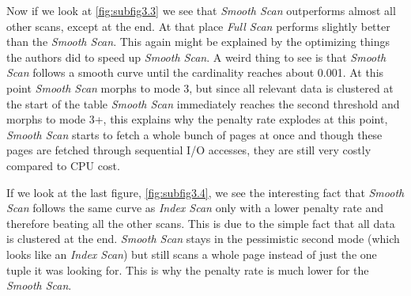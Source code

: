 \documentclass[a4paper,11pt,twoside]{article}
\begin{document}
Now if we look at \autoref{fig:subfig3.3} we see that \textit{Smooth Scan} outperforms almost all other scans, except at the end. At that place \textit{Full Scan} performs slightly better than the \textit{Smooth Scan}. This again might be explained by the optimizing things the authors did to speed up \textit{Smooth Scan}. A weird thing to see is that \textit{Smooth Scan} follows a smooth curve until the cardinality reaches about 0.001. At this point \textit{Smooth Scan} morphs to mode 3, but since all relevant data is clustered at the start of the table \textit{Smooth Scan} immediately reaches the second threshold and morphs to mode 3+, this explains why the penalty rate explodes at this point, \textit{Smooth Scan} starts to fetch a whole bunch of pages at once and though these pages are fetched through sequential I/O accesses, they are still very costly compared to CPU cost. 

If we look at the last figure, \autoref{fig:subfig3.4}, we see the interesting fact that \textit{Smooth Scan} follows the same curve as \textit{Index Scan} only with a lower penalty rate and therefore beating all the other scans. This is due to the simple fact that all data is clustered at the end. \textit{Smooth Scan} stays in the pessimistic second mode (which looks like an \textit{Index Scan}) but still scans a whole page instead of just the one tuple it was looking for. This is why the penalty rate is much lower for the \textit{Smooth Scan}.
   
\end{document}
